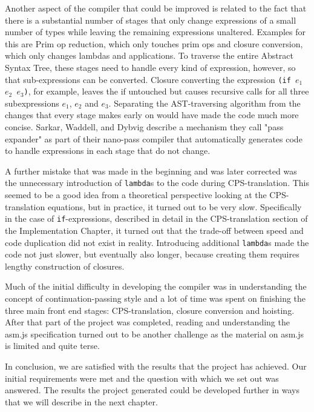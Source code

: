 \documentclass[11pt]{report}
\begin{document}
Another aspect of the compiler that could be improved is related to the fact that there is a substantial number of stages that only change expressions of a small number of types while leaving the remaining expressions unaltered. Examples for this are Prim op reduction, which only touches prim ops and closure conversion, which only changes lambdas and applications. To traverse the entire Abstract Syntax Tree, these stages need to handle every kind of expression, however, so that sub-expressions can be converted. Closure converting the expression \texttt{(if $e_1$ $e_2$ $e_3$)}, for example, leaves the if untouched but causes recursive calls for all three subexpressions $e_1$, $e_2$ and $e_3$. Separating the AST-traversing algorithm from the changes that every stage makes early on would have made the code much more concise. Sarkar, Waddell, and Dybvig describe \cite{Sarkar:2004:NIC:1016848.1016878} a mechanism they call "pass expander" as part of their nano-pass compiler that automatically generates code to handle expressions in each stage that do not change.

A further mistake that was made in the beginning and was later corrected was the unnecessary introduction of \texttt{lambda}s to the code during CPS-translation. This seemed to be a good idea from a theoretical perspective looking at the CPS-translation equations, but in practice, it turned out to be very slow. Specifically in the case of \texttt{if}-expressions, described in detail in the CPS-translation section of the Implementation Chapter, it turned out that the trade-off between speed and code duplication did not exist in reality. Introducing additional \texttt{lambda}s made the code not just slower, but eventually also longer, because creating them requires lengthy construction of closures.

Much of the initial difficulty in developing the compiler was in understanding the concept of continuation-passing style and a lot of time was spent on finishing the three main front end stages: CPS-translation, closure conversion and hoisting. After that part of the project was completed, reading and understanding the asm.js specification turned out to be another challenge as the material on asm.js is limited and quite terse.

In conclusion, we are satisfied with the results that the project has achieved. Our initial requirements were met and the question with which we set out was answered. The results the project generated could be developed further in ways that we will describe in the next chapter.
\end{document}
